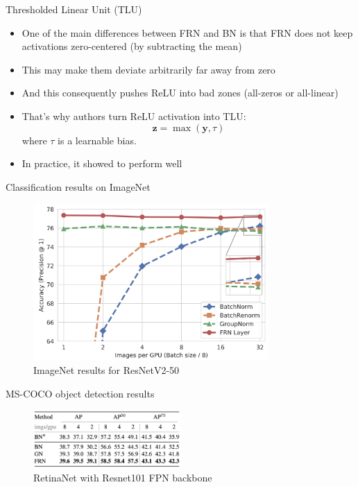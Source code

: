 \documentclass[handout, 10pt]{beamer}
\begin{document}
\begin{frame}{Thresholded Linear Unit (TLU)}
\begin{itemize}
    \item\pause One of the main differences between FRN and BN is that FRN does not keep activations zero-centered (by subtracting the mean)
    \item\pause This may make them deviate arbitrarily far away from zero 
    \item\pause And this consequently pushes ReLU into bad zones (all-zeros or all-linear)
    \item\pause That's why authors turn ReLU activation into TLU:
\begin{equation}
\boldsymbol{z}=\max (\boldsymbol{y}, \tau)
\end{equation}
where $\tau$ is a learnable bias.
\item\pause In practice, it showed to perform well
\end{itemize}
\end{frame}


\begin{frame}{Classification results on ImageNet}
\begin{figure}
\centering
\includegraphics[width=0.8\textwidth]{images/imagenet-results}
\caption{ImageNet results for ResNetV2-50}
\end{figure}
\end{frame}


\begin{frame}{MS-COCO object detection results}
\begin{figure}
\centering
\includegraphics[width=0.5\textwidth]{images/object-detection-results}
\caption{RetinaNet with Resnet101 FPN backbone}
\end{figure}
\end{frame}
\end{document}
